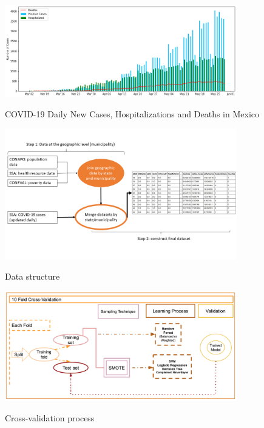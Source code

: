 \documentclass[hidelinks,10pt]{article}
\begin{document}
	\begin{figure}[ht]
	\caption{COVID-19 Daily New Cases, Hospitalizations and Deaths in Mexico}
	\centering 
	\includegraphics[width=0.9\textwidth]{output_5_0}
	\label{fig:4}
\end{figure}
\begin{figure}[ht]
	\caption{Data structure}
	\centering 
	\includegraphics[width=0.9\textwidth]{FinalDF}
	\label{fig:5}
\end{figure}
\begin{figure}[ht]
	\caption{Cross-validation process}
	\centering 
	\includegraphics[width=0.9\textwidth]{cv}
	\label{fig:6}
\end{figure}
\end{document}

